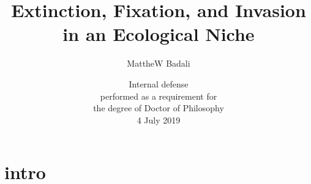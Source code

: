 \documentclass{beamer}
\title[Coexistence and Extinction of Competing Species]{Extinction, Fixation, and Invasion in an Ecological Niche}
\author[M.A.Badali]{MattheW Badali}
\date[04/07/2019]{Internal defense\\
	performed as a requirement for\\
	the degree of Doctor of Philosophy\\
	4 July 2019}
\begin{document}
\frame{\titlepage}


\section[Background]{intro}
\end{document}
